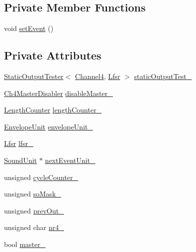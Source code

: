 \subsection*{Private Member Functions}
\begin{DoxyCompactItemize}
\item 
void \hyperlink{classgambatte_1_1Channel4_ac2368165993248064ae125cfe2ca91e1}{set\+Event} ()
\end{DoxyCompactItemize}
\subsection*{Private Attributes}
\begin{DoxyCompactItemize}
\item 
\hyperlink{classgambatte_1_1StaticOutputTester}{Static\+Output\+Tester}$<$ \hyperlink{classgambatte_1_1Channel4}{Channel4}, \hyperlink{classgambatte_1_1Channel4_1_1Lfsr}{Lfsr} $>$ \hyperlink{classgambatte_1_1Channel4_a2ae503294dbb4386f217e90bb08aaa6d}{static\+Output\+Test\+\_\+}
\item 
\hyperlink{classgambatte_1_1Channel4_1_1Ch4MasterDisabler}{Ch4\+Master\+Disabler} \hyperlink{classgambatte_1_1Channel4_aeefcab821229da926e19fb11ac2ef458}{disable\+Master\+\_\+}
\item 
\hyperlink{classgambatte_1_1LengthCounter}{Length\+Counter} \hyperlink{classgambatte_1_1Channel4_a4f9c75702f5a400ea6ca17434c6e6b29}{length\+Counter\+\_\+}
\item 
\hyperlink{classgambatte_1_1EnvelopeUnit}{Envelope\+Unit} \hyperlink{classgambatte_1_1Channel4_ae07fccf524b60794a12e5afc0342b94e}{envelope\+Unit\+\_\+}
\item 
\hyperlink{classgambatte_1_1Channel4_1_1Lfsr}{Lfsr} \hyperlink{classgambatte_1_1Channel4_a5493adf86be0159f03099f9e8075cd39}{lfsr\+\_\+}
\item 
\hyperlink{classgambatte_1_1SoundUnit}{Sound\+Unit} $\ast$ \hyperlink{classgambatte_1_1Channel4_ab444e6e073b5dd7a2759d50d994f281d}{next\+Event\+Unit\+\_\+}
\item 
unsigned \hyperlink{classgambatte_1_1Channel4_acd27b1580124db2ae0d5d9d5a2a37119}{cycle\+Counter\+\_\+}
\item 
unsigned \hyperlink{classgambatte_1_1Channel4_aee75980e238dc250c990699d992b7416}{so\+Mask\+\_\+}
\item 
unsigned \hyperlink{classgambatte_1_1Channel4_a9ec39dc02e8e49b3fa5814948a165012}{prev\+Out\+\_\+}
\item 
unsigned char \hyperlink{classgambatte_1_1Channel4_af5b498521db67593f428c2bec73bc071}{nr4\+\_\+}
\item 
bool \hyperlink{classgambatte_1_1Channel4_a25e0e535a19cce5e84f1c3a861a0bce3}{master\+\_\+}
\end{DoxyCompactItemize}
